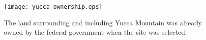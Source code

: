 \begin{figure}[htbp!]
  \begin{center}
    \texttt{[image: yucca\_ownership.eps]}
  \end{center}
  \caption{The land surrounding and including Yucca Mountain was already owned 
  by the federal government when the site was selected.}
  \label{fig:yucca_ownership}
\end{figure}
